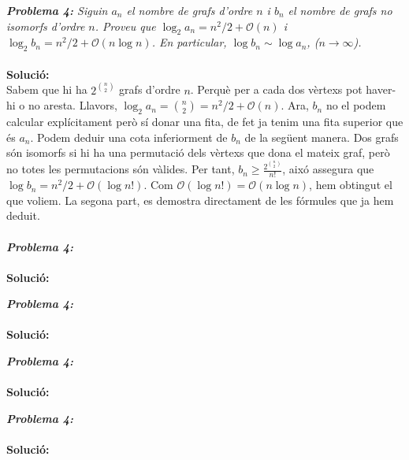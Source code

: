 \documentclass[10pt]{article}
\begin{document}
\large
\textsl{\textbf{Problema 4:} Siguin $a_n$ el nombre de grafs d'ordre $n$ i $b_n$ el nombre de grafs no isomorfs d'ordre $n$. Proveu que $\log_2 a_n = n^2/2 + \mathcal{O}(n)$ i $\log_2 b_n = n^2/2+\mathcal{O}(n\log n)$. En particular, $\log b_n \sim \log a_n$, ($n\rightarrow \infty$).} \\ \\
\textbf{Solució:} \\
\normalsize
Sabem que hi ha $2^{{n}\choose{2}}$ grafs d'ordre $n$. Perquè per a cada dos vèrtexs pot haver-hi o no aresta. Llavors, $\log_2 a_n = {{n}\choose{2}} = n^2/2 + \mathcal{O}(n)$. Ara, $b_n$ no el podem calcular explícitament però sí donar una fita, de fet ja tenim una fita superior que és $a_n$. Podem deduir una cota inferiorment de $b_n$ de la següent manera. Dos grafs són isomorfs si hi ha una permutació dels vèrtexs que dona el mateix graf, però no totes les permutacions són vàlides. Per tant, $b_n\geq \frac{2^{{n}\choose{2}}}{n!}$, aixó assegura que $\log b_n = n^2/2 + \mathcal{O}(\log n!)$. Com $\mathcal{O}(\log n!)=\mathcal{O}(n\log n)$, hem obtingut el que voliem. La segona part, es demostra directament de les fórmules que ja hem deduit. \\ \\

\large
\textsl{\textbf{Problema 4:}} \\ \\
\textbf{Solució:} \\
\normalsize

\large
\textsl{\textbf{Problema 4:}} \\ \\
\textbf{Solució:} \\
\normalsize

\large
\textsl{\textbf{Problema 4:}} \\ \\
\textbf{Solució:} \\
\normalsize

\large
\textsl{\textbf{Problema 4:}} \\ \\
\textbf{Solució:} \\
\normalsize
\end{document}
